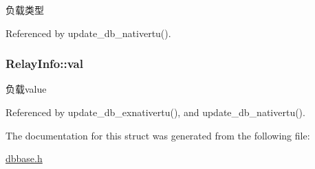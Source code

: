 负载类型 



Referenced by update\-\_\-db\-\_\-nativertu().

\hypertarget{structRelayInfo_a4dc7bba5c5dd2ee1ff7172bae972936f}{
\subsubsection[{val}]{ Relay\-Info\-::val}}\label{structRelayInfo_a4dc7bba5c5dd2ee1ff7172bae972936f}


负载value 



Referenced by update\-\_\-db\-\_\-exnativertu(), and update\-\_\-db\-\_\-nativertu().



The documentation for this struct was generated from the following file\-:\begin{DoxyCompactItemize}
\item 
\hyperlink{dbbase_8h}{dbbase.\-h}\end{DoxyCompactItemize}
